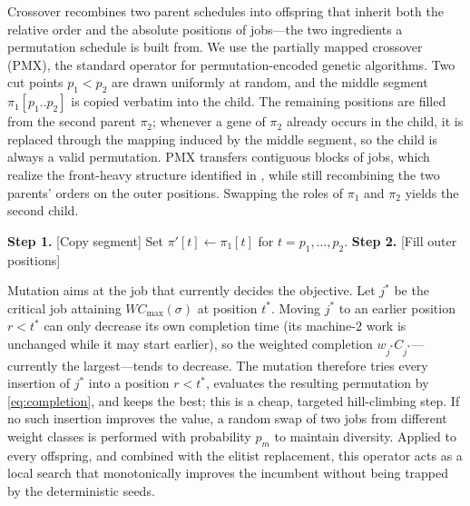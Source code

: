 \documentclass[12pt]{article}
\begin{document}
\begin{sloppypar}
Crossover recombines two parent schedules into offspring that inherit both the relative order
and the absolute positions of jobs---the two ingredients a permutation schedule is built
from. We use the partially mapped crossover (PMX), the standard operator for
permutation-encoded genetic algorithms. Two cut points $p_1<p_2$ are drawn uniformly at
random, and the middle segment $\pi_1[p_1..p_2]$ is copied verbatim into the child. The
remaining positions are filled from the second parent $\pi_2$; whenever a gene of $\pi_2$
already occurs in the child, it is replaced through the mapping induced by the middle
segment, so the child is always a valid permutation. PMX transfers contiguous blocks of jobs,
which realize the front-heavy structure identified in , while
still recombining the two parents' orders on the outer positions. Swapping the roles of
$\pi_1$ and $\pi_2$ yields the second child.

\begin{algorithm}[tbp]
\small
\linespread{1.2}\selectfont
\SetAlgoLined
\DontPrintSemicolon
\caption{Partially Mapped Crossover (PMX) for $F2 \parallel W C_{\max}$}\label{alg:pmx}
\BlankLine
\textbf{Step 1.} [Copy segment] Set $\pi'[t]\gets\pi_1[t]$ for $t=p_1,\dots,p_2$. \;
\textbf{Step 2.} [Fill outer positions] 
\end{algorithm}

Mutation aims at the job that currently decides the objective. Let $j^{*}$ be the critical
job attaining $W C_{\max}(\sigma)$ at position $t^{*}$. Moving $j^{*}$ to an earlier position
$r<t^{*}$ can only decrease its own completion time (its machine-$2$ work is unchanged while
it may start earlier), so the weighted completion $w_{j^{*}}C_{j^{*}}$---currently the
largest---tends to decrease. The mutation therefore tries every insertion of $j^{*}$ into a
position $r<t^{*}$, evaluates the resulting permutation by \cref{eq:completion}, and keeps
the best; this is a cheap, targeted hill-climbing step. If no such insertion improves the
value, a random swap of two jobs from different weight classes is performed with probability
$p_m$ to maintain diversity. Applied to every offspring, and combined with the elitist
replacement, this operator acts as a local search that monotonically improves the incumbent
without being trapped by the deterministic seeds.


\end{sloppypar}
\end{document}
